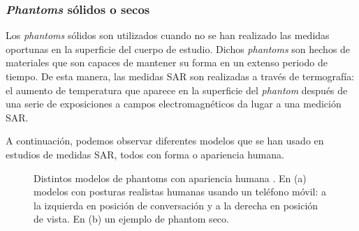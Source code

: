 \subsubsection{\textit{Phantoms} sólidos o secos}

Los \textit{phantoms} sólidos son utilizados cuando no se han realizado las medidas oportunas en la superficie del cuerpo de estudio. Dichos \textit{phantoms} son hechos de materiales que son capaces de mantener su forma en un extenso periodo de tiempo. De esta manera, las medidas SAR son realizadas a través de termografía: el aumento de temperatura que aparece en la superficie del \textit{phantom} después de una serie de exposiciones a campos electromagnéticos da lugar a una medición SAR.

A continuación, podemos observar diferentes modelos que se han usado en estudios de medidas SAR, todos con forma o apariencia humana.

\begin{figure}[!htb]
    \centering
    \caption{Distintos modelos de phantoms con apariencia humana \cite{yang}. En (a) modelos con posturas realistas humanas usando un teléfono móvil: a la izquierda en posición de conversación y a la derecha en posición de vista. En (b) un ejemplo de phantom seco.}
    \label{fig:fig3.2}
\end{figure}

